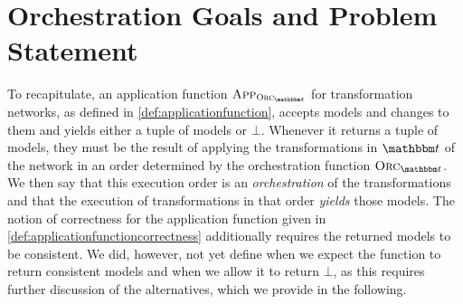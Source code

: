 \section{Orchestration Goals and Problem Statement} %

To recapitulate, an application function $\appfunction{\orcfunction{\transformationset{T}}}$ for transformation networks, as defined in \autoref{def:applicationfunction}, accepts models and changes to them and yields either a tuple of models or $\bot$.
Whenever it returns a tuple of models, they must be the result of applying the transformations in $\transformationset{T}$ of the network in an order determined by the orchestration function $\orcfunction{\transformationset{T}}$.
We then say that this execution order is an \emph{orchestration} of the transformations and that the execution of transformations in that order \emph{yields} those models.
The notion of correctness for the application function given in \autoref{def:applicationfunctioncorrectness} additionally requires the returned models to be consistent.
We did, however, not yet define when we expect the function to return consistent models and when we allow it to return $\bot$, as this requires further discussion of the alternatives, which we provide in the following.

